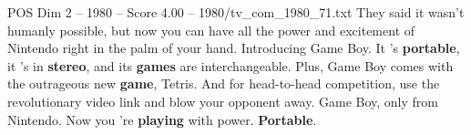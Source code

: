 \begin{textsample}{POS Dim 2 – 1980 – Score 4.00 – 1980/tv\_com\_1980\_71.txt}  \label{ex:f2_pos_061}
They said it wasn't humanly possible, but now you can have all the power and excitement of Nintendo right in the palm of your hand.
Introducing Game Boy.
It 's \textbf{portable}, it 's in \textbf{stereo}, and its \textbf{games} are interchangeable.
Plus, Game Boy comes with the outrageous new \textbf{game}, Tetris.
And for head-to-head competition, use the revolutionary video link and blow your opponent away.
Game Boy, only from Nintendo.
Now you 're \textbf{playing} with power. \textbf{Portable}.

\end{textsample}
